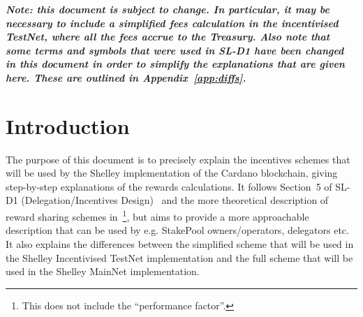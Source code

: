 \documentclass[11pt,a4paper,dvipsnames,twosided,final]{article}
\newcommand{\cardano}[1]{Cardano}
\begin{document}
\begin{abstract}
  \noindent
  This document provides a high-level overview of the proposed incentives rewards schemes for
  the Shelley Incentivised TestNet and the subsequent MainNet, highlighting key
  differences between the two schemes.  It is intended to act as a
  simple, easy to follow, guide to the operation of each of the incentives schemes that explains each step of the calculation.
  It assumes a basic familiarity with the concepts of a \emph{blockchain} approach.
  The incentives scheme is designed to ensure the correct operation of the Ouroboros Praos
  protocol, including maintaining built-in defences against ``Sybil-in-Sybil'' security attacks
  that could lead to corruption of the blockchain.  It builds on sound economic theory.
  A simplified version of the incentives scheme is used for the Incentivised TestNet, using fixed rewards,
  omitting fee calculations, StakePool deposits, the influence of the StakePool owner(s)' pledge on
  the StakePool's desirability, the apparent performance of the StakePool etc. (some of these features may be
  added in later versions of the Incentivised TestNet).
  This document is based on SL-D1 (Delegation/Incentives Design)~\cite{delegation_design} and~\cite{bkks2018} and feeds in to SL-D5
  (Formal Ledger Specification. Version 1)~\cite{shelley_spec} as well as the online rewards calculator and the Shelley Incentivised TestNet and MainNet  implementations and quality assurance programmes.
\end{abstract}

\vspace{3.5in}
\noindent
\textbf{\emph{Note: this document is subject to change.  In particular, it may be necessary to include a simplified fees calculation
    in the incentivised TestNet, where all the fees accrue to the Treasury.
Also note that some terms and symbols that were used in SL-D1 have been changed in this document
in order to simplify the explanations that are given here.  These are outlined in Appendix~\ref{app:diffs}.
}}

\thispagestyle{empty}
\clearpage
\pagestyle{myheadings}
\renewcommand{\thepage}{\arabic{page}}
\setcounter{page}{1}
\section{Introduction}
\label{sec:introduction}

The purpose of this document is to precisely explain the incentives schemes that will be used by the Shelley implementation
of the \cardano{} blockchain, giving step-by-step explanations of the rewards calculations.
It follows Section~5 of SL-D1 (Delegation/Incentives Design)~\cite{delegation_design} and the more theoretical description of reward
sharing schemes in~\cite{bkks2018}\footnote{This does not include the ``performance factor''.}, but aims to provide a more approachable
description that can be used by e.g. StakePool owners/operators, delegators etc.
It also explains the differences between the simplified scheme that will be used in the Shelley Incentivised TestNet implementation and the
full scheme that will be used in the Shelley MainNet implementation.
\end{document}
